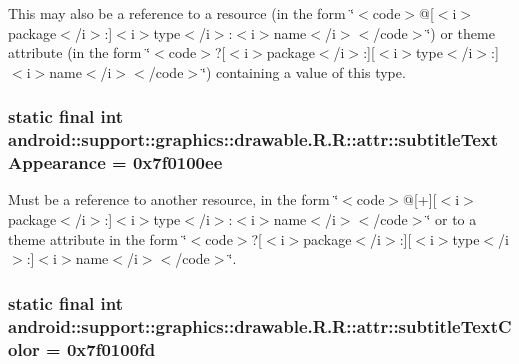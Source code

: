 This may also be a reference to a resource (in the form \char`\"{}$<$code$>$@\mbox{[}$<$i$>$package$<$/i$>$:\mbox{]}$<$i$>$type$<$/i$>$:$<$i$>$name$<$/i$>$$<$/code$>$\char`\"{}) or theme attribute (in the form \char`\"{}$<$code$>$?\mbox{[}$<$i$>$package$<$/i$>$:\mbox{]}\mbox{[}$<$i$>$type$<$/i$>$:\mbox{]}$<$i$>$name$<$/i$>$$<$/code$>$\char`\"{}) containing a value of this type. \hypertarget{classandroid_1_1support_1_1graphics_1_1drawable_1_1_r_1_1attr_649e0a40f11a2fb3850dca5cab6f53c1}{
\subsubsection[{subtitleTextAppearance}]{\setlength{\rightskip}{0pt plus 5cm}static final int android::support::graphics::drawable.R.R::attr::subtitleTextAppearance = 0x7f0100ee}}
\label{classandroid_1_1support_1_1graphics_1_1drawable_1_1_r_1_1attr_649e0a40f11a2fb3850dca5cab6f53c1}


Must be a reference to another resource, in the form \char`\"{}$<$code$>$@\mbox{[}+\mbox{]}\mbox{[}$<$i$>$package$<$/i$>$:\mbox{]}$<$i$>$type$<$/i$>$:$<$i$>$name$<$/i$>$$<$/code$>$\char`\"{} or to a theme attribute in the form \char`\"{}$<$code$>$?\mbox{[}$<$i$>$package$<$/i$>$:\mbox{]}\mbox{[}$<$i$>$type$<$/i$>$:\mbox{]}$<$i$>$name$<$/i$>$$<$/code$>$\char`\"{}. \hypertarget{classandroid_1_1support_1_1graphics_1_1drawable_1_1_r_1_1attr_6f2d7cdf0376fd9938d01efb6e7f8527}{
\subsubsection[{subtitleTextColor}]{\setlength{\rightskip}{0pt plus 5cm}static final int android::support::graphics::drawable.R.R::attr::subtitleTextColor = 0x7f0100fd}}
\label{classandroid_1_1support_1_1graphics_1_1drawable_1_1_r_1_1attr_6f2d7cdf0376fd9938d01efb6e7f8527}


